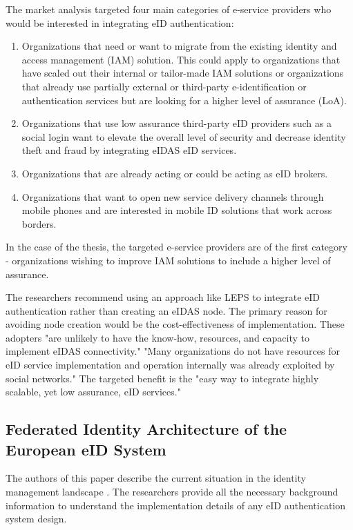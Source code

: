 The market analysis targeted four main categories of e-service providers who would be interested in integrating eID authentication:

\begin{enumerate}
    \item Organizations that need or want to migrate from the existing identity and access management (IAM) solution. This could apply to organizations that have scaled out their internal or tailor-made IAM solutions or organizations that already use partially external or third-party e-identification or authentication services but are looking for a higher level of assurance (LoA).
    \item Organizations that use low assurance third-party eID providers such as a social login want to elevate the overall level of security and decrease identity theft and fraud by integrating eIDAS eID services.
    \item Organizations that are already acting or could be acting as eID brokers.
    \item Organizations that want to open new service delivery channels through mobile phones and are interested in mobile ID solutions that work across borders.
\end{enumerate}

In the case of the thesis, the targeted e-service providers are of the first category - organizations wishing to improve IAM solutions to include a higher level of assurance.

The researchers recommend using an approach like LEPS to integrate eID authentication rather than creating an eIDAS node. The primary reason for avoiding node creation would be the cost-effectiveness of implementation. These adopters "are unlikely to have the know-how, resources, and capacity to implement eIDAS connectivity." "Many organizations do not have resources for eID service implementation and operation internally was already exploited by social networks." The targeted benefit is the "easy way to integrate highly scalable, yet low assurance, eID services."

\subsection{Federated Identity Architecture of the European eID System}

The authors of this paper describe the current situation in the identity management landscape \cite{federated-europe-identity}. The researchers provide all the necessary background information to understand the implementation details of any eID authentication system design.


